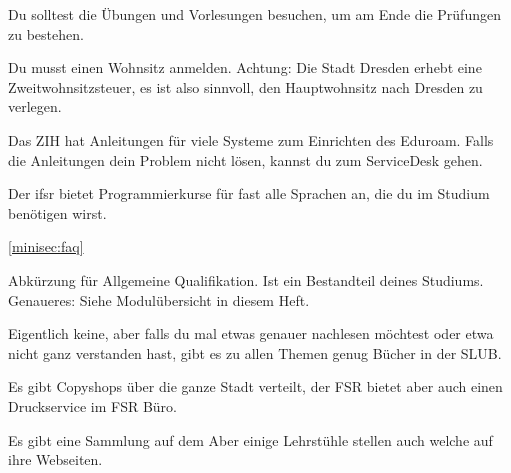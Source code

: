 Du solltest die Übungen und Vorlesungen besuchen, um am Ende die Prüfungen zu bestehen.

Du musst einen Wohnsitz anmelden. Achtung: Die Stadt Dresden erhebt eine Zweitwohnsitzsteuer, es ist also sinnvoll, den Hauptwohnsitz nach Dresden zu verlegen.

Das ZIH hat Anleitungen für viele Systeme zum Einrichten des Eduroam. Falls die Anleitungen dein Problem nicht lösen, kannst du zum ServiceDesk gehen.

Der ifsr bietet Programmierkurse für fast alle Sprachen an, die du im Studium benötigen wirst. 

\label{minisec:faq}
\ref{minisec:faq}

Abkürzung für Allgemeine Qualifikation. Ist ein Bestandteil deines Studiums. Genaueres: Siehe Modulübersicht in diesem Heft.

Eigentlich keine, aber falls du mal etwas genauer nachlesen möchtest oder etwa nicht ganz verstanden hast, gibt es zu allen Themen genug Bücher in der SLUB.

Es gibt Copyshops über die ganze Stadt verteilt, der FSR bietet aber auch einen Druckservice im FSR Büro.

Es gibt eine Sammlung auf dem  Aber einige Lehrstühle stellen auch welche auf ihre Webseiten.
